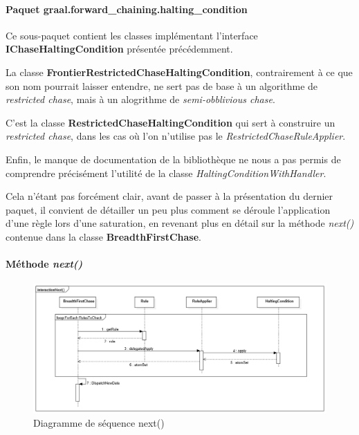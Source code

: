          \paragraph{Paquet graal.forward\_chaining.halting\_condition} Ce sous-paquet contient les classes implémentant l'interface \textbf{IChaseHaltingCondition} présentée précédemment. 
         \par La classe \textbf{FrontierRestrictedChaseHaltingCondition}, contrairement à ce que son nom pourrait laisser entendre, ne sert pas de base à un algorithme de \textit{restricted chase}, mais à un alogrithme de \textit{semi-obblivious chase}. \par C'est la classe \textbf{RestrictedChaseHaltingCondition} qui sert à construire un \textit{restricted chase}, dans les cas où l'on n'utilise pas le \textit{RestrictedChaseRuleApplier}.
         \par Enfin, le manque de documentation de la bibliothèque ne nous a pas permis de comprendre précisément l'utilité de la classe \textit{HaltingConditionWithHandler}.
         \par Cela n'étant pas forcément clair, avant de passer à la présentation du dernier paquet, il convient de détailler un peu plus comment se déroule l'application d'une règle lors d'une saturation, en revenant plus en détail sur la méthode \textit{next()} contenue dans la classe \textbf{BreadthFirstChase}.
         
         
         \paragraph{Méthode \textit{next()}}
        \begin{figure}[H]
        \centering
        \includegraphics[width=\textwidth]{pictures/DiagrammeSequence.png}
        \caption{Diagramme de séquence next()}
        \label{fig:dsequence}
        \end{figure}
        
